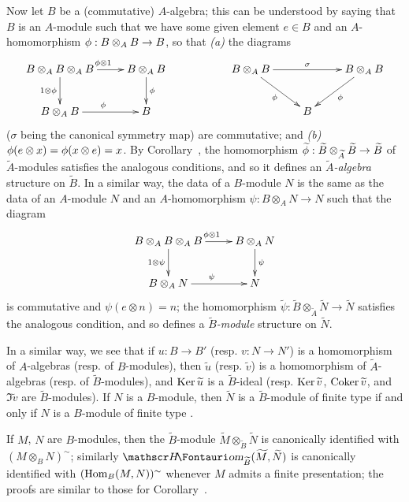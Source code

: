 \begin{env}[1.3.13]
\label{1.1.3.13}
Now let $B$ be a (commutative) $A$-algebra; this can be understood by saying that $B$ is an $A$-module such that we have some given element $e\in B$ and an $A$-homomorphism $\vphi:B\otimes_A B\to B$, so that \emph{(a)} the diagrams
\[
  \xymatrix{
    B\otimes_A B\otimes_A B\ar[r]^{\vphi\otimes 1}\ar[d]_{1\otimes\vphi} &
    B\otimes_A B\ar[d]^\vphi & &
    B\otimes_A B\ar[rr]^\sigma\ar[rd]_\vphi & &
    B\otimes_A B\ar[dl]^\vphi\\
    B\otimes_A B\ar[r]^\vphi &
    B & & &
    B
  }
\]
($\sigma$ being the canonical symmetry map) are commutative; and \emph{(b)} $\phi(e\otimes x)=\phi(x\otimes e)=x$.
By Corollary~, the homomorphism $\widetilde{\vphi}:\widetilde{B}\otimes_{\widetilde{A}}\widetilde{B}\to\widetilde{B}$ of $\widetilde{A}$-modules satisfies the analogous conditions, and so it defines an \emph{$\widetilde{A}$-algebra} structure on $\widetilde{B}$.
In a similar way, the data of a $B$-module $N$ is the same as the data of an $A$-module $N$ and an $A$-homomorphism $\psi:B\otimes_A N\to N$ such that the diagram
\[
  \xymatrix{
    B\otimes_A B\otimes_A B\ar[r]^{\vphi\otimes 1}\ar[d]_{1\otimes\psi} &
    B\otimes_A N\ar[d]^\psi\\
    B\otimes_A N\ar[r]^\psi &
    N
  }
\]
is commutative and $\psi(e\otimes n)=n$;
the homomorphism $\widetilde{\psi}:\widetilde{B}\otimes_{\widetilde{A}}\widetilde{N}\to\widetilde{N}$ satisfies the analogous condition, and so defines a \emph{$\widetilde{B}$-module} structure on $\widetilde{N}$.

In a similar way, we see that if $u:B\to B'$ (resp. $v:N\to N'$) is a homomorphism of $A$-algebras (resp. of $B$-modules), then $\widetilde{u}$ (resp. $\widetilde{v}$) is a homomorphism of $\widetilde{A}$-algebras (resp. of $\widetilde{B}$-modules), and $\operatorname{Ker}\widetilde{u}$ is a $\widetilde{B}$-ideal (resp. $\operatorname{Ker}\widetilde{v}$, $\operatorname{Coker}\widetilde{v}$, and $\Im\widetilde{v}$ are $\widetilde{B}$-modules).
If $N$ is a $B$-module, then $\widetilde{N}$ is a $\widetilde{B}$-module of finite type if and only if $N$ is a $B$-module of finite type .

If $M$, $N$ are $B$-modules, then the $\widetilde{B}$-module $\widetilde{M}\otimes_{\widetilde{B}}\widetilde{N}$ is canonically identified with $(M\otimes_B N)^\sim$;
similarly $\shHom_{\widetilde{B}}(\widetilde{M},\widetilde{N})$ is canonically identified with $(\operatorname{Hom}_B(M,N))^\sim$ whenever $M$ admits a finite presentation;
the proofs are similar to those for Corollary~.


\end{env}
